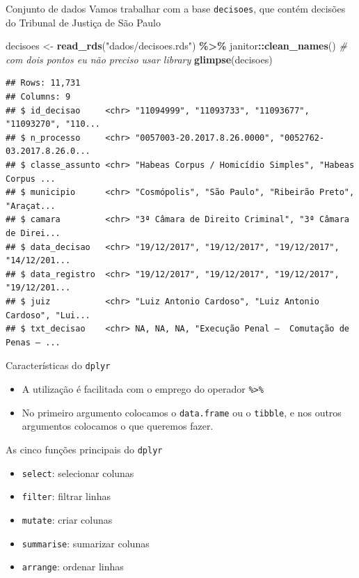 \documentclass[
  9pt,
  ignorenonframetext,
]{beamer}
\newenvironment{Shaded}{\begin{snugshade}}{\end{snugshade}}
\newcommand{\CommentTok}[1]{\textcolor[rgb]{0.56,0.35,0.01}{\textit{#1}}}
\newcommand{\KeywordTok}[1]{\textcolor[rgb]{0.13,0.29,0.53}{\textbf{#1}}}
\newcommand{\NormalTok}[1]{#1}
\newcommand{\OperatorTok}[1]{\textcolor[rgb]{0.81,0.36,0.00}{\textbf{#1}}}
\newcommand{\StringTok}[1]{\textcolor[rgb]{0.31,0.60,0.02}{#1}}
\begin{document}
\begin{frame}[fragile]{Conjunto de dados}
\protect\hypertarget{conjunto-de-dados}{}
Vamos trabalhar com a base \texttt{decisoes}, que contém decisões do
Tribunal de Justiça de São Paulo

\begin{Shaded}
\begin{Highlighting}[]
\NormalTok{decisoes \textless{}{-}}\StringTok{ }\KeywordTok{read\_rds}\NormalTok{(}\StringTok{"dados/decisoes.rds"}\NormalTok{) }\OperatorTok{\%\textgreater{}\%}
\StringTok{  }\NormalTok{janitor}\OperatorTok{::}\KeywordTok{clean\_names}\NormalTok{() }\CommentTok{\# com dois pontos eu não preciso usar library}
\KeywordTok{glimpse}\NormalTok{(decisoes)}
\end{Highlighting}
\end{Shaded}

\begin{verbatim}
## Rows: 11,731
## Columns: 9
## $ id_decisao     <chr> "11094999", "11093733", "11093677", "11093270", "110...
## $ n_processo     <chr> "0057003-20.2017.8.26.0000", "0052762-03.2017.8.26.0...
## $ classe_assunto <chr> "Habeas Corpus / Homicídio Simples", "Habeas Corpus ...
## $ municipio      <chr> "Cosmópolis", "São Paulo", "Ribeirão Preto", "Araçat...
## $ camara         <chr> "3ª Câmara de Direito Criminal", "3ª Câmara de Direi...
## $ data_decisao   <chr> "19/12/2017", "19/12/2017", "19/12/2017", "14/12/201...
## $ data_registro  <chr> "19/12/2017", "19/12/2017", "19/12/2017", "19/12/201...
## $ juiz           <chr> "Luiz Antonio Cardoso", "Luiz Antonio Cardoso", "Lui...
## $ txt_decisao    <chr> NA, NA, NA, "Execução Penal –  Comutação de Penas – ...
\end{verbatim}
\end{frame}

\begin{frame}[fragile]{Características do \texttt{dplyr}}
\protect\hypertarget{caracteruxedsticas-do-dplyr}{}
\begin{itemize}
\item
  A utilização é facilitada com o emprego do operador
  \texttt{\%\textgreater{}\%}
\item
  No primeiro argumento colocamos o \texttt{data.frame} ou o
  \texttt{tibble}, e nos outros argumentos colocamos o que queremos
  fazer.
\end{itemize}
\end{frame}

\begin{frame}[fragile]{As cinco funções principais do \texttt{dplyr}}
\protect\hypertarget{as-cinco-funuxe7uxf5es-principais-do-dplyr}{}
\begin{itemize}
\item
  \texttt{select}: selecionar colunas
\item
  \texttt{filter}: filtrar linhas
\item
  \texttt{mutate}: criar colunas
\item
  \texttt{summarise}: sumarizar colunas
\item
  \texttt{arrange}: ordenar linhas
\end{itemize}
\end{frame}
\end{document}
